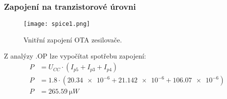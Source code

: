 \subsubsection{Zapojení na tranzistorové úrovni}
    \begin{figure}[h!]
        \centering
        \texttt{[image: spice1.png]}
        \caption{Vnitřní zapojení OTA zesilovače.}
        \label{fig:spice1.png}
    \end{figure}
    
    Z analýzy .OP lze vypočítat spotřebu zapojení:
    \begin{align*}
        P&=U_{CC}\cdot (I_{p5} +I_{p3} +I_{p4} ) \\
        P&=\num{1.8}\cdot (\num{20.34e-6} +\num{21.142e-6} +\num{106.07e-6} ) \\
        P&=\qty{265.59}{\micro W} \\
    \end{align*}
